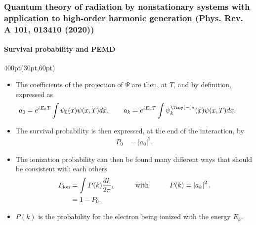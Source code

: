 \begin{frame}
\frametitle{Quantum theory of radiation by nonstationary systems 
	with application to high-order harmonic generation
        (Phys. Rev. A 101, 013410 (2020))}
	\framesubtitle{Survival probability and PEMD}

\begin{textblock*}{400pt}(30pt,60pt)
\footnotesize
\begin{itemize}
\item The coefficients of the projection of $\bar{\Psi}$ are then, at $T$,
and by definition, expressed as
\begin{equation}
a_0 = e^{iE_0 T}\int \psi_0(x) \psi(x,T)dx, \hspace{20pt}
a_k = e^{iE_k T}\int \psi_k^{\Tiny (-)*}(x) \psi(x,T)dx. \hspace{20pt}
\label{eqn:a0k}
\end{equation}



\item The survival probability is then expressed, 
at the end of the interaction, by
\begin{align}
   P_0         & = \left| a_0 \right|^2. \label{eqn:surv}  
\end{align}

\item The ionization probability can then be found many different 
ways that should be consistent with each others
\begin{align}
   P_{\rm ion} & = \int P(k)\frac{dk}{2\pi}, 
 \hspace{30pt} \mbox{with}\hspace{30pt} P(k) = \left| a_k \right|^2. 
\label{eqn:pion1} \\
               & = 1-P_0.
\end{align}

\item  $P(k)$ is the probability for the electron 
being ionized with the energy $E_k$.

\end{itemize}
\end{textblock*}


\end{frame}



